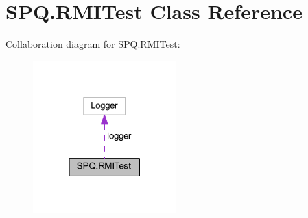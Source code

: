 \hypertarget{class_s_p_q_1_1_r_m_i_test}{}\section{S\+P\+Q.\+R\+M\+I\+Test Class Reference}
\label{class_s_p_q_1_1_r_m_i_test}


Collaboration diagram for S\+P\+Q.\+R\+M\+I\+Test\+:
\nopagebreak
\begin{figure}[H]
\begin{center}
\leavevmode
\includegraphics[width=157pt]{class_s_p_q_1_1_r_m_i_test__coll__graph}
\end{center}
\end{figure}
